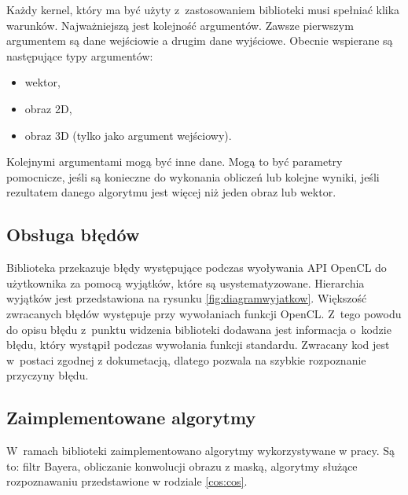 Każdy kernel, który ma być użyty z~zastosowaniem biblioteki musi spełniać klika warunków. Najważniejszą jest kolejność argumentów. Zawsze pierwszym argumentem są dane wejściowie a drugim dane wyjściowe. Obecnie wspierane są następujące typy argumentów:
\begin{itemize}
\item wektor,
\item obraz 2D,
\item obraz 3D (tylko jako argument wejściowy).
\end{itemize}
Kolejnymi argumentami mogą być inne dane. Mogą to być parametry pomocnicze, jeśli są konieczne do wykonania obliczeń lub kolejne wyniki, jeśli rezultatem danego algorytmu jest więcej niż jeden obraz lub wektor.

\subsection{Obsługa błędów}
\label{subsec:obslugabledow}

Biblioteka przekazuje błędy występujące podczas wyoływania API OpenCL do użytkownika za pomocą wyjątków, które są usystematyzowane. Hierarchia wyjątków jest przedstawiona na rysunku \ref{fig:diagramwyjatkow}. Większość zwracanych błędów występuje przy wywołaniach funkcji OpenCL. Z~tego powodu do opisu błędu z~punktu widzenia biblioteki dodawana jest informacja o~kodzie błędu, który wystąpił podczas wywołania funkcji standardu. Zwracany kod jest w~postaci zgodnej z dokumetacją, dlatego pozwala na szybkie rozpoznanie przyczyny błędu.

\subsection{Zaimplementowane algorytmy}
\label{subsec:algorytmy}

W~ramach biblioteki zaimplementowano algorytmy wykorzystywane w pracy. Są to: filtr Bayera, obliczanie konwolucji obrazu z maską, algorytmy służące rozpoznawaniu przedstawione w rodziale \ref{cos:cos}.